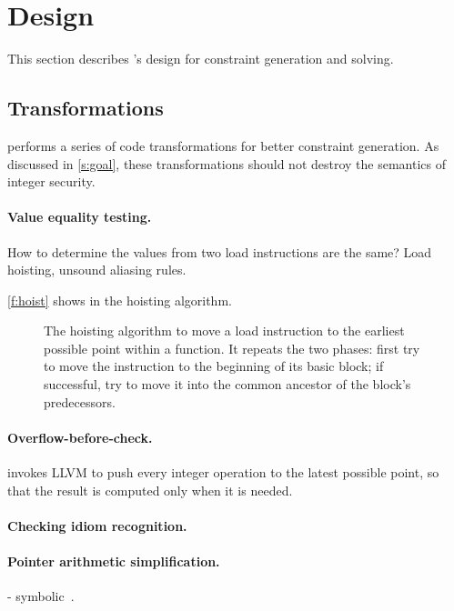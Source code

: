 \section{Design}
\label{s:gen}

This section describes \sys's design for constraint generation and
solving.

\subsection{Transformations}

\sys performs a series of code transformations for better constraint
generation.  As discussed in \autoref{s:goal}, these transformations
should not destroy the semantics of integer security.

\paragraph{Value equality testing.}
How to determine the values from two load instructions
are the same? Load hoisting, unsound aliasing rules.

\autoref{f:hoist} shows in the hoisting algorithm.

\begin{figure}
\footnotesize

\caption{The hoisting algorithm to move a load instruction to the
earliest possible point within a function.  It repeats the two
phases: first try to move the instruction to the beginning of its
basic block; if successful, try to move it into the common ancestor
of the block's predecessors.}
\label{f:hoist}
\end{figure}

\paragraph{Overflow-before-check.}
\sys invokes LLVM to push every integer operation to the latest
possible point, so that the result is computed only when it is
needed.

\paragraph{Checking idiom recognition.}

\paragraph{Pointer arithmetic simplification.}
- symbolic~\cite{engelen:symbolic}.

